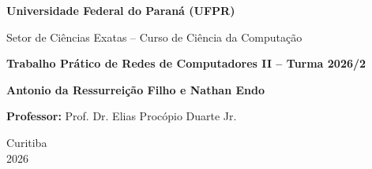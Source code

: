 \documentclass[12pt,a4paper,oneside]{article}
\begin{document}
\begin{titlepage}
    \centering
    {\large \textbf{Universidade Federal do Paraná (UFPR)}\par}
    {\large Setor de Ciências Exatas -- Curso de Ciência da Computação\par}
    \vspace{8cm}
    
    {\Large \textbf{Trabalho Prático de Redes de Computadores II -- Turma 2026/2}\par}
    \vspace{2cm}
    
    {\large \textbf{Antonio da Ressurreição Filho e Nathan Endo}\par}
    \vspace{1.5cm}
    
    \vfill
    
    \vspace{1.5cm}
    
    {\large \textbf{Professor:} Prof. Dr. Elias Procópio Duarte Jr.\par}
    \vspace{2cm}
    
    {\large Curitiba \\ 2026}\par
\end{titlepage}

\newpage

\tableofcontents
\newpage








\end{document}

